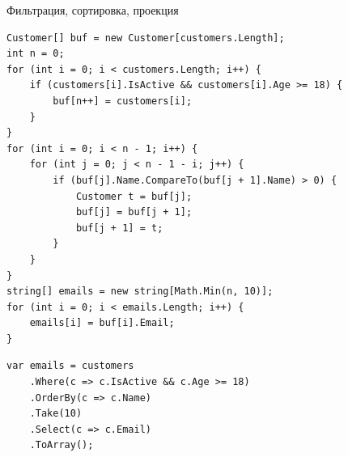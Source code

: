 \documentclass[aspectratio=169,10pt,t]{beamer}
\begin{document}
\begin{frame}[fragile]{Фильтрация, сортировка, проекция}
  \slidetop
  \begin{minipage}[t]{0.53\textwidth}
    \par\vspace{0.5em}
\begin{lstlisting}[style=csharp,basicstyle=\ttfamily\fontsize{6.2}{7.0}\selectfont]
Customer[] buf = new Customer[customers.Length];
int n = 0;
for (int i = 0; i < customers.Length; i++) {
    if (customers[i].IsActive && customers[i].Age >= 18) {
        buf[n++] = customers[i];
    }
}
for (int i = 0; i < n - 1; i++) {
    for (int j = 0; j < n - 1 - i; j++) {
        if (buf[j].Name.CompareTo(buf[j + 1].Name) > 0) {
            Customer t = buf[j];
            buf[j] = buf[j + 1];
            buf[j + 1] = t;
        }
    }
}
string[] emails = new string[Math.Min(n, 10)];
for (int i = 0; i < emails.Length; i++) {
    emails[i] = buf[i].Email;
}
\end{lstlisting}
  \end{minipage}\hfill
  \begin{minipage}[t]{0.445\textwidth}
    \par\vspace{0.5em}
\begin{lstlisting}[style=csharp,basicstyle=\ttfamily\scriptsize]
var emails = customers
    .Where(c => c.IsActive && c.Age >= 18)
    .OrderBy(c => c.Name)
    .Take(10)
    .Select(c => c.Email)
    .ToArray();
\end{lstlisting}
    \vspace{0.9em}
    \par
    \vspace{0.7em}
    \par
  \end{minipage}
\end{frame}
\end{document}
